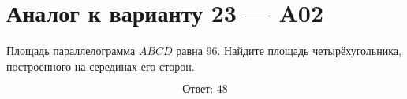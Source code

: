 


\section*{Аналог к варианту 23 — A02}
Площадь параллелограмма \(ABCD\) равна \(96\). Найдите площадь четырёхугольника, построенного на серединах его сторон.
\begin{center}\figParallelogramMidpoints\end{center}
\[\boxed{\text{Ответ: }48}\]

